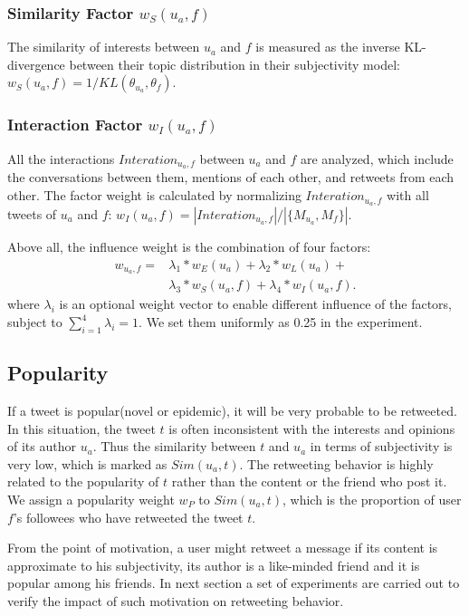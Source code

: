 \documentclass[letterpaper]{article}
\begin{document}
\subsubsection{Similarity Factor $ w_S(u_a,f) $} The similarity of interests between $ u_a $ and $ f $ is measured as the inverse KL-divergence between their topic distribution in their subjectivity model: $ w_S(u_a,f)= 1/KL(\theta_{u_a},\theta_f)$.
\subsubsection{Interaction Factor $ w_I(u_a,f) $} All the interactions $ Interation_{u_a,f} $ between $ u_a $ and $ f $ are analyzed, which include the conversations between them, mentions of each other, and retweets from each other. The factor weight is calculated by normalizing $Interation_{u_a,f}$ with all tweets of $ u_a $ and $ f $: $ w_I(u_a,f)=|Interation_{u_a,f}| /|\{ M_{u_a}, M_f \}| $.

Above all, the influence weight is the combination of four factors:
\begin{equation}
\begin{split}
w_{u_a,f}=& \lambda_1*w_E(u_a)+\lambda_2*w_L(u_a)+\\
   &\lambda_3*w_S(u_a,f)+\lambda_4*w_I(u_a,f). 
\end{split}
\end{equation}
where $ \lambda_i $ is an optional weight vector to enable different influence of the factors,  subject to $ \sum_{i=1}^{4}\lambda_i=1 $. We set them uniformly as 0.25 in the experiment.

\subsection{Popularity}

If a tweet is popular(novel or epidemic), it will be very probable to be retweeted. In this situation, the tweet $ t $ is often inconsistent with the interests and opinions of its author $ u_a $. Thus the similarity between $ t $ and $ u_a $ in terms of subjectivity is very low, which is marked as $ Sim(u_a,t) $. The retweeting behavior is highly related to the popularity of $ t $ rather than the content or the friend who post it. We assign a popularity weight $ w_P $ to $ Sim(u_a,t) $, which is the proportion of user $ f $'s followees who have retweeted the tweet $ t $.

From the point of motivation, a user might retweet a message if its content is approximate to his subjectivity, its author is a like-minded friend and it is popular among his friends. 
In next section a set of experiments are carried out to verify the impact of such motivation on retweeting behavior. 
\end{document}

